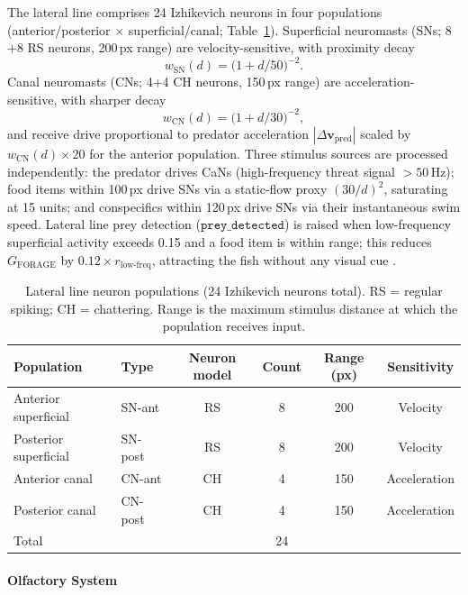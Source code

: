 \documentclass[12pt]{article}
\begin{document}
The lateral line comprises 24 Izhikevich neurons in four populations
(anterior/posterior $\times$ superficial/canal; Table~\ref{tab:ll}).
Superficial neuromasts (SNs; 8$+$8 RS neurons, 200\,px range) are
velocity-sensitive, with proximity decay
\begin{equation}\label{eq:sn}
  w_\text{SN}(d) = \bigl(1 + d/50\bigr)^{-2}.
\end{equation}
Canal neuromasts (CNs; 4$+$4 CH neurons, 150\,px range) are
acceleration-sensitive, with sharper decay
\begin{equation}\label{eq:cn}
  w_\text{CN}(d) = \bigl(1 + d/30\bigr)^{-2},
\end{equation}
and receive drive proportional to predator acceleration
$|\Delta\mathbf{v}_\text{pred}|$ scaled by $w_\text{CN}(d) \times 20$
for the anterior population.
Three stimulus sources are processed independently:
the predator drives CaNs (high-frequency threat signal $> 50$\,Hz);
food items within 100\,px drive SNs via a static-flow proxy
$(30/d)^2$, saturating at 15 units; and conspecifics within 120\,px
drive SNs via their instantaneous swim speed.
Lateral line prey detection ($\texttt{prey\_detected}$) is raised when
low-frequency superficial activity exceeds 0.15 and a food item is
within range; this reduces $G_\text{FORAGE}$ by
$0.12 \times r_\text{low-freq}$, attracting the fish without any
visual cue \citep{coombs2002,bleckmann2012}.

\begin{table}[h]
\centering
\caption{Lateral line neuron populations (24 Izhikevich neurons total).
RS = regular spiking; CH = chattering. Range is the maximum stimulus
distance at which the population receives input.}
\label{tab:ll}
\begin{tabular}{llcccc}
\toprule
Population & Type & Neuron model & Count & Range (px) & Sensitivity \\
\midrule
Anterior superficial & SN-ant & RS & 8 & 200 & Velocity \\
Posterior superficial & SN-post & RS & 8 & 200 & Velocity \\
Anterior canal & CN-ant & CH & 4 & 150 & Acceleration \\
Posterior canal & CN-post & CH & 4 & 150 & Acceleration \\
\midrule
\multicolumn{3}{l}{Total} & 24 & & \\
\bottomrule
\end{tabular}
\end{table}

\paragraph{Olfactory System}
\end{document}
